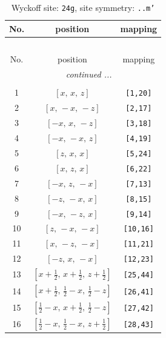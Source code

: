 \documentclass[fleqn,8pt]{jsarticle}
\begin{document}
\begin{longtable}{ccc}
\caption{Wyckoff site: {\tt 24g}, site symmetry: {\tt ..m'}}
 \\
 \hline \hline
No. & position & mapping \\ \hline \endfirsthead

\multicolumn{2}{l}{\tablename\ \thetable{}} \\
 \hline \hline
No. & position & mapping \\ \hline \endhead

 \hline \hline
\multicolumn{2}{r}{\footnotesize\it continued ...} \\ \endfoot

 \hline \hline
\multicolumn{2}{r}{} \\ \endlastfoot

1 & $\left[ x,\, x,\, z \right]$ & {\tt [1,20]} \\ \hline
2 & $\left[ x,\, - x,\, - z \right]$ & {\tt [2,17]} \\ \hline
3 & $\left[ - x,\, x,\, - z \right]$ & {\tt [3,18]} \\ \hline
4 & $\left[ - x,\, - x,\, z \right]$ & {\tt [4,19]} \\ \hline
5 & $\left[ z,\, x,\, x \right]$ & {\tt [5,24]} \\ \hline
6 & $\left[ x,\, z,\, x \right]$ & {\tt [6,22]} \\ \hline
7 & $\left[ - x,\, z,\, - x \right]$ & {\tt [7,13]} \\ \hline
8 & $\left[ - z,\, - x,\, x \right]$ & {\tt [8,15]} \\ \hline
9 & $\left[ - x,\, - z,\, x \right]$ & {\tt [9,14]} \\ \hline
10 & $\left[ z,\, - x,\, - x \right]$ & {\tt [10,16]} \\ \hline
11 & $\left[ x,\, - z,\, - x \right]$ & {\tt [11,21]} \\ \hline
12 & $\left[ - z,\, x,\, - x \right]$ & {\tt [12,23]} \\ \hline
13 & $\left[ x + \frac{1}{2},\, x + \frac{1}{2},\, z + \frac{1}{2} \right]$ & {\tt [25,44]} \\ \hline
14 & $\left[ x + \frac{1}{2},\, \frac{1}{2} - x,\, \frac{1}{2} - z \right]$ & {\tt [26,41]} \\ \hline
15 & $\left[ \frac{1}{2} - x,\, x + \frac{1}{2},\, \frac{1}{2} - z \right]$ & {\tt [27,42]} \\ \hline
16 & $\left[ \frac{1}{2} - x,\, \frac{1}{2} - x,\, z + \frac{1}{2} \right]$ & {\tt [28,43]} \\ \hline

\end{longtable}
\end{document}
